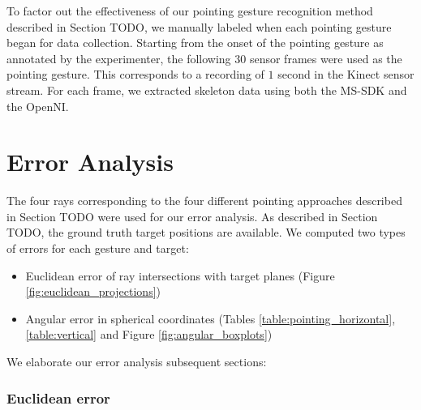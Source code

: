 \documentclass[12pt]{gatech-thesis}
\begin{document}
To factor out the effectiveness of our pointing gesture recognition method described in Section TODO, we manually labeled when each pointing gesture began for data collection. Starting from the onset of the pointing gesture as annotated by the experimenter, the following $30$ sensor frames were used as the pointing gesture. This corresponds to a recording of $1$ second in the Kinect sensor stream. For each frame, we extracted skeleton data using both the MS-SDK and the OpenNI.

\section{Error Analysis}
\label{sec:pointing_gesture_error}

The four rays corresponding to the four different pointing approaches described in Section TODO were used for our error analysis.  As described in Section TODO, the ground truth target positions are available. We computed two types of errors for each gesture and target: 

\begin{itemize}
\item Euclidean error of ray intersections with target planes (Figure \ref{fig:euclidean_projections})
\item Angular error in spherical coordinates (Tables \ref{table:pointing_horizontal},\ref{table:vertical} and Figure \ref{fig:angular_boxplots})
\end{itemize}

We elaborate our error analysis subsequent sections:

\subsubsection{Euclidean error}
\label{sec:pointing_euclidean_error}
\end{document}

